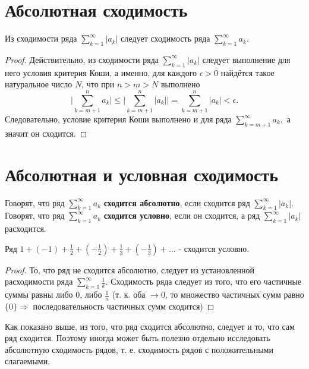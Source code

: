 	\section{Абсолютная сходимость}
	
	\begin{corollary}
		Из сходимости ряда $\sum^{\infty}_{k = 1} |a_k|$ следует сходимость ряда $\sum^{\infty}_{k = 1} a_k$.
	\end{corollary}
	
	\begin{proof}
		Действительно, из сходимости ряда $\sum^{\infty}_{k = 1} |a_k|$  следует выполнение для него условия критерия Коши, а именно, для каждого $\epsilon > 0$ найдётся такое натуральное число $N$, что при $n > m > N$ выполнено \[ \bigg|\sum^n_{k = m + 1} a_k\bigg| \leqslant \bigg|\sum^n_{k = m + 1} |a_k|\bigg| = \sum^n_{k = m + 1} |a_k| < \epsilon. \]
		Следовательно, условие критерия Коши выполнено и для ряда $\sum^{\infty}_{k = m + 1} a_k,$ а значит он сходится.
	\end{proof}
	
	\section{Абсолютная и условная сходимость}
	
	\begin{definition}
		Говорят, что ряд $\sum^{\infty}_{k = 1} a_k$ \textbf{сходится абсолютно}, если сходится ряд $\sum^{\infty}_{k = 1} |a_k|$. Говорят, что ряд $\sum^{\infty}_{k = 1} a_k$ \textbf{сходится условно}, если он сходится, а ряд $\sum^{\infty}_{k = 1} |a_k|$ расходится.
	\end{definition}
	
	\begin{example}
		Ряд $1 + (-1) + \frac{1}{2} + (-\frac{1}{2}) + \frac{1}{3} + (-\frac{1}{3}) + ...$ - сходится условно.
	\end{example}
	
	\begin{proof}
		То, что ряд не сходится абсолютно, следует из установленной расходимости ряда $\sum^{\infty}_{k = 1} \frac{1}{k}.$ Сходимость ряда следует из того, что его частичные суммы равны либо 0, либо $\frac{1}{n}$ (т. к. оба $\to 0$, то множество частичных сумм равно $\{0\} \Rightarrow$ последовательность частичных сумм сходится)
	\end{proof}
	
	Как показано выше, из того, что ряд сходится абсолютно, следует и то, что сам ряд сходится. Поэтому иногда может быть полезно отдельно исследовать абсолютную сходимость рядов, т. е. сходимость рядов с положительными слагаемыми.
	
